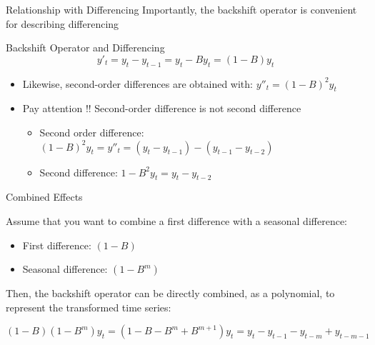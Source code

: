 \documentclass{beamer}
\begin{document}
\begin{frame}{Relationship with Differencing}
  Importantly, the backshift operator is convenient for describing differencing\\

  \medskip
  
  \begin{exampleblock}{Backshift Operator and Differencing}
    $$y'_t = y_t - y_{t-1} = y_t - By_t = (1-B)y_t$$
  \end{exampleblock}


  \begin{itemize}
    \item Likewise, second-order differences are obtained with: $y''_t = (1-B)^2y_t$  
    \item Pay attention !! Second-order difference is not second difference 
      \begin{itemize}
      \item Second order difference: $(1-B)^2 y_t = y''_t = (y_t - y_{t-1}) - (y_{t-1} - y_{t-2})$
      \item Second difference: $1-B^2 y_t = y_t - y_{t-2}$
      \end{itemize}
  \end{itemize}
  
\end{frame}


\begin{frame}{Combined Effects}

Assume that you want to combine a first difference with a seasonal difference:
  
  \begin{itemize}
  \item First difference: $(1-B)$
  \item Seasonal difference: $(1-B^m)$
  \end{itemize}

  Then, the backshift operator can be directly combined, as a polynomial, to represent the transformed time series:

  \begin{equation*}
    (1-B)(1-B^m)y_t = (1 - B - B^m + B^{m+1})y_t = y_t - y_{t-1} - y_{t-m} + y_{t-m-1}
  \end{equation*}    
\end{frame}
\end{document}
